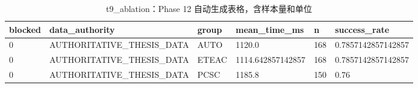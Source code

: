 \begin{table}[htbp]
\centering
\caption{t9_ablation：Phase 12 自动生成表格，含样本量和单位}
\begin{tabular}{llllll}
\hline
blocked & data_authority & group & mean_time_ms & n & success_rate \\
\hline
0 & AUTHORITATIVE\_THESIS\_DATA & AUTO & 1120.0 & 168 & 0.7857142857142857 \\
0 & AUTHORITATIVE\_THESIS\_DATA & ETEAC & 1114.642857142857 & 168 & 0.7857142857142857 \\
0 & AUTHORITATIVE\_THESIS\_DATA & PCSC & 1185.8 & 150 & 0.76 \\
\hline
\end{tabular}
\end{table}
